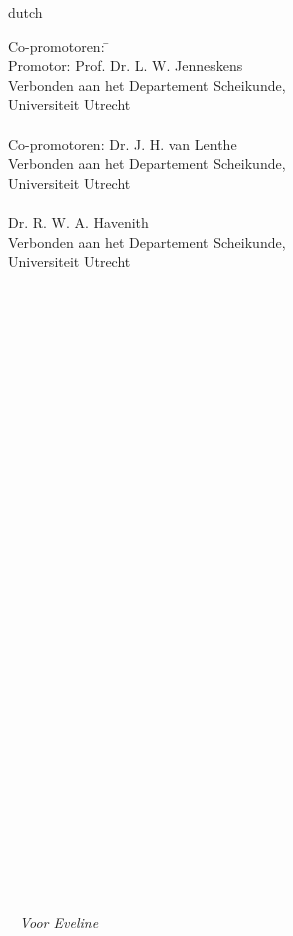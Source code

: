 \begin{otherlanguage*}{dutch}
\begin{tabbing}
Co-promotoren: \= \kill\\
Promotor: \>Prof. Dr. L. W. Jenneskens\\
          \>Verbonden aan het Departement Scheikunde,\\
          \>Universiteit Utrecht\\
\\
Co-promotoren: \>Dr. J. H. van Lenthe\\
               \>Verbonden aan het Departement Scheikunde,\\
               \>Universiteit Utrecht\\
\\
               \>Dr. R. W. A. Havenith\\
               \>Verbonden aan het Departement Scheikunde,\\
               \>Universiteit Utrecht\\  
\\
\end{tabbing}


\newpage
\mbox{ }\\
\mbox{ }\\
\mbox{ }\\
\mbox{ }\\
\mbox{ }\\
\mbox{ }\\
\mbox{ }\\
\mbox{ }\\
\mbox{ }\\
\mbox{ }\\
\mbox{ }\\
\mbox{ }\\
\mbox{ }\\
\mbox{ }\\
\mbox{ }\\
\mbox{ }\\
\mbox{ }\\
\mbox{ }\\
\mbox{ }\\
\mbox{ }\\
\mbox{ }\\
\mbox{ }\\
\mbox{ }\\
\mbox{ }\\
\mbox{ }\\
\mbox{ }\\
\mbox{ }\\
\mbox{ }\\
\mbox{ }\\
\mbox{ }\\
\mbox{ }\\
\mbox{ }
\raggedleft
\textit{Voor Eveline}


\end{otherlanguage*}
